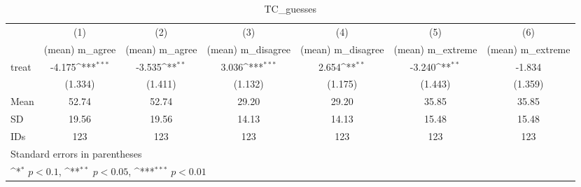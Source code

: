 \begin{table}[htbp]\centering
\def\sym#1{\ifmmode^{#1}\else\(^{#1}\)\fi}
\caption{TC\_guesses}
\begin{tabular}{l*{6}{c}}
\hline\hline
                                &\multicolumn{1}{c}{(1)}&\multicolumn{1}{c}{(2)}&\multicolumn{1}{c}{(3)}&\multicolumn{1}{c}{(4)}&\multicolumn{1}{c}{(5)}&\multicolumn{1}{c}{(6)}\\
                                &\multicolumn{1}{c}{(mean) m\_agree}&\multicolumn{1}{c}{(mean) m\_agree}&\multicolumn{1}{c}{(mean) m\_disagree}&\multicolumn{1}{c}{(mean) m\_disagree}&\multicolumn{1}{c}{(mean) m\_extreme}&\multicolumn{1}{c}{(mean) m\_extreme}\\
\hline
treat                           &   -4.175\sym{***}&   -3.535\sym{**} &    3.036\sym{***}&    2.654\sym{**} &   -3.240\sym{**} &   -1.834         \\
                                &  (1.334)         &  (1.411)         &  (1.132)         &  (1.175)         &  (1.443)         &  (1.359)         \\
\hline
Mean                            &    52.74         &    52.74         &    29.20         &    29.20         &    35.85         &    35.85         \\
SD                              &    19.56         &    19.56         &    14.13         &    14.13         &    15.48         &    15.48         \\
IDs                             &      123         &      123         &      123         &      123         &      123         &      123         \\
\hline\hline
\multicolumn{7}{l}{\footnotesize Standard errors in parentheses}\\
\multicolumn{7}{l}{\footnotesize \sym{*} \(p<0.1\), \sym{**} \(p<0.05\), \sym{***} \(p<0.01\)}\\
\end{tabular}
\end{table}

